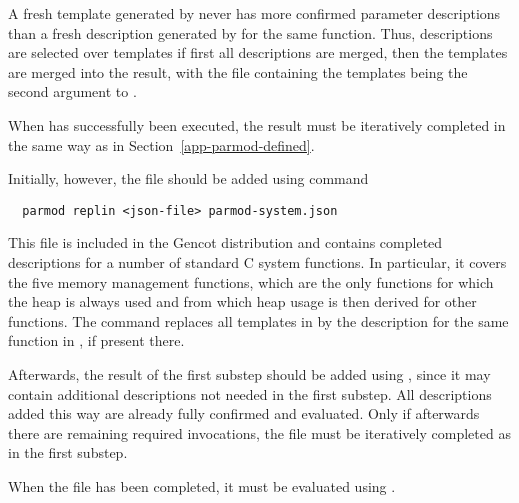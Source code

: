 A fresh template generated by  never has more confirmed parameter descriptions than a fresh 
description generated by  for the same function. Thus, descriptions are selected over templates
if first all descriptions are merged, then the templates are merged into the result, with the file containing the
templates being the second argument to .

When  has successfully been executed, the result must be iteratively completed in the same way 
as in Section~\ref{app-parmod-defined}. 

Initially, however, the file  should be added using command
\begin{verbatim}
  parmod replin <json-file> parmod-system.json
\end{verbatim}
This file is included in the Gencot distribution and contains completed descriptions for a number of 
standard C system functions. In particular, it covers the five memory management functions, which are the 
only functions for which the heap is always used and from which heap usage is then derived for other functions. 
The command  replaces all templates in  by the description for the same function in
, if present there.

Afterwards, the result of the first substep should be added 
using , since it may contain additional descriptions not needed in the first substep.
All descriptions added this way are already fully confirmed and evaluated. Only if afterwards there are remaining 
required invocations, the file must be iteratively completed as in the first substep. 

When the file has been completed, it must be evaluated using .
